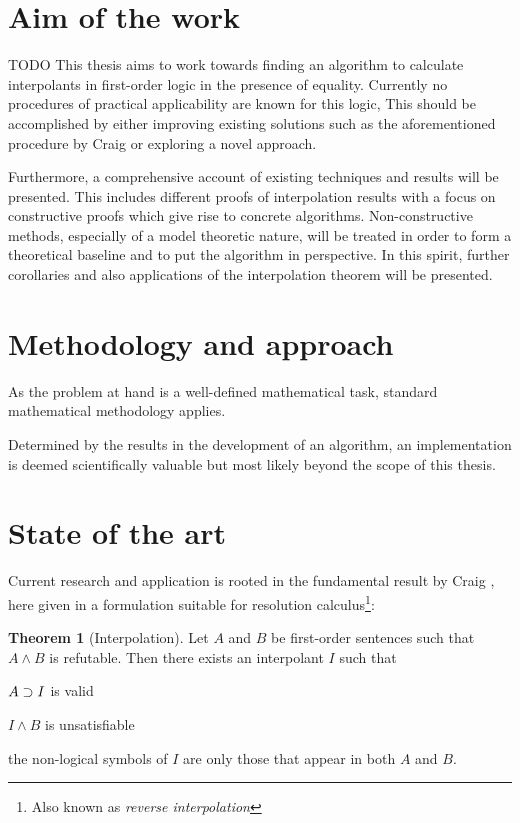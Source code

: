 \documentclass[,%
			paper=a4,%
			DIV12,
			liststotoc,
			bibtotoc,
			draft=false,%
			numbers=noendperiod
			]{scrartcl}
\theoremstyle{definition}
\newtheorem{thm}{Theorem}
\begin{document}
\section{Aim of the work}

TODO
This thesis aims to work towards finding an algorithm to calculate interpolants in first-order logic in the presence of equality.
Currently no procedures of practical applicability are known for this logic,  
This should be accomplished by either improving existing solutions such as the aforementioned procedure by Craig or exploring a novel approach.

Furthermore, a comprehensive account of existing techniques and results will be presented.
This includes different proofs of interpolation results with a focus on constructive proofs which give rise to concrete algorithms.
Non-constructive methods, especially of a model theoretic nature, will be treated in order to form a theoretical baseline and to put the algorithm in perspective.
In this spirit, further corollaries and also applications of the interpolation theorem will be presented.


\section{Methodology and approach}

As the problem at hand is a well-defined mathematical task, standard mathematical methodology applies.

Determined by the results in the development of an algorithm, an implementation is deemed scientifically valuable but most likely beyond the scope of this thesis.


\section{State of the art}

Current research and application is rooted in the fundamental result by Craig \cite{craig57linear}, here given in a formulation suitable for resolution calculus\footnote{Also known as \emph{reverse interpolation}}:

\begin{thm}[Interpolation]
	Let $A$ and $B$ be first-order sentences such that $A \land B$ is refutable. 
	Then there exists an interpolant $I$ such that
	\begin{compactenum}
		\item $ A \supset I$ is valid 
		\item $I \land B$ is unsatisfiable
		\item the non-logical symbols of $I$ are only those that appear in both $A$ and $B$.
	\end{compactenum}
\end{thm}
\end{document}
